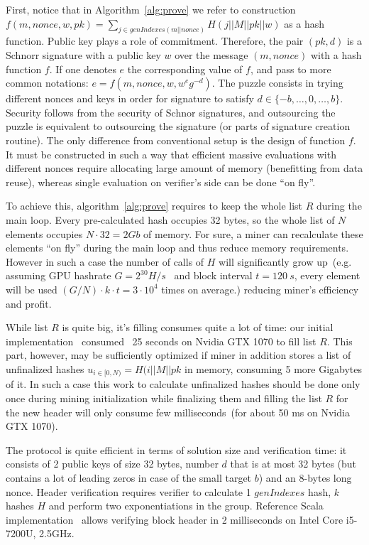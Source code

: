 \documentclass[]{article}
\begin{document}
    First, notice that in Algorithm~\ref{alg:prove} we refer to construction
    $f(m,nonce,w,pk)=\sum_{j\in genIndexes(m||nonce)} H(j||M||pk||w)$ as a hash
    function. Public key plays a role of commitment. Therefore, the pair
    $(pk,d)$ is a Schnorr signature with a public key $w$ over the message
    $(m,nonce)$ with a hash function $f$. If one denotes $e$ the corresponding
    value of $f$, and pass to more common notations:
    $e=f(m,nonce,w,w^eg^{-d})$. The puzzle consists in trying
    different nonces and keys in order for signature to satisfy
    $d\in\{-b,\dots,0,\dots,b\}$. Security follows from the security of Schnor
    signatures, and outsourcing the puzzle is equivalent to outsourcing the
    signature (or parts of signature creation routine). The only difference from
    conventional setup is the design of function $f$. It must be constructed in such
    a way that efficient massive evaluations with different nonces require
    allocating large amount of memory (benefitting from data reuse), whereas
    single evaluation on verifier's side can be done ``on fly''.

    To achieve this, algorithm~\ref{alg:prove} requires to keep the whole list $R$ during the main loop.
    Every pre-calculated hash occupies 32 bytes, so the whole list of $N$ elements
    occupies $N \cdot 32 = 2 Gb$ of memory.
    For sure, a miner can recalculate these elements ``on fly'' during the main loop and
    thus reduce memory requirements.
    However in such a case the number of calls of $H$ will significantly grow up~(e.g.
    assuming GPU hashrate $G = 2^{30} H/s$~\cite{gpuHashrate} and block interval $t=120~s$,
    every element will be used $(G / N) \cdot k \cdot t = 3 \cdot 10^4$ times on average.)
    reducing miner's efficiency and profit.

    While list $R$ is quite big, it's filling consumes quite a lot of time: our initial implementation~\cite{ergoMiner}
    consumed ~25 seconds on Nvidia GTX 1070 to fill list $R$. This part, however, may be sufficiently
    optimized if miner in addition stores a list of unfinalized hashes $u_{i \in [0,N)}=H(i||M||pk$
    in memory, consuming 5 more Gigabytes of it. In such a case this work to calculate unfinalized hashes should
    be done only once during mining initialization while finalizing them and filling the list $R$
    for the new header will only consume few milliseconds~(for about 50 ms on Nvidia GTX 1070).

    The protocol is quite efficient in terms of solution size and verification time: it consists of 2 public keys of
    size 32 bytes, number $d$ that is at most 32 bytes
    (but contains a lot of leading zeros in case of the small target $b$) and an
    8-bytes long nonce. Header verification requires verifier to calculate 1 $genIndexes$
    hash, $k$ hashes $H$ and perform two exponentiations in the group. Reference
    Scala implementation~\cite{ergoGit} allows verifying block header in 2
    milliseconds on Intel Core i5-7200U, 2.5GHz.
\end{document}
